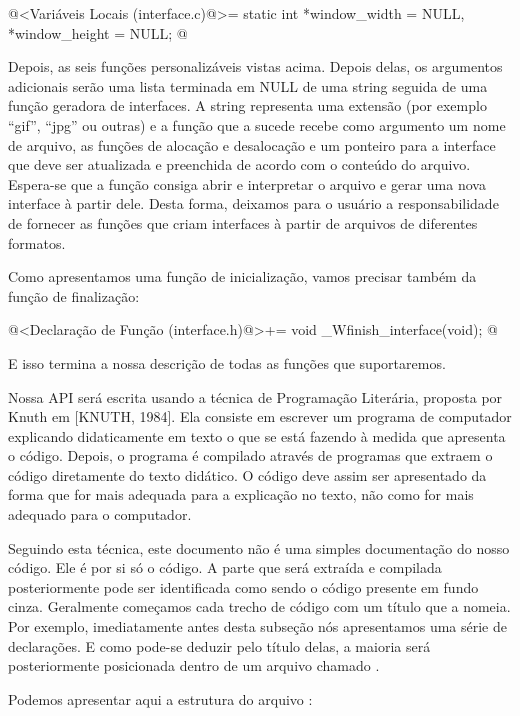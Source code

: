 \iniciocodigo
@<Variáveis Locais (interface.c)@>=
static int *window_width = NULL, *window_height = NULL;
@
\fimcodigo

Depois, as seis funções personalizáveis vistas
acima. Depois delas, os argumentos adicionais serão uma lista
terminada em NULL de uma string seguida de uma função geradora de
interfaces. A string representa uma extensão (por exemplo ``gif'',
``jpg'' ou outras) e a função que a sucede recebe como argumento um
nome de arquivo, as funções de alocação e desalocação e um ponteiro
para a interface que deve ser atualizada e preenchida de acordo com o
conteúdo do arquivo. Espera-se que a função consiga abrir e
interpretar o arquivo e gerar uma nova interface à partir dele.  Desta
forma, deixamos para o usuário a responsabilidade de fornecer as
funções que criam interfaces à partir de arquivos de diferentes
formatos.

Como apresentamos uma função de inicialização, vamos precisar também
da função de finalização:

\iniciocodigo
@<Declaração de Função (interface.h)@>+=
void _Wfinish_interface(void);
@
\fimcodigo

E isso termina a nossa descrição de todas as funções que suportaremos.


Nossa API será escrita usando a técnica de Programação Literária,
proposta por Knuth em [KNUTH, 1984]. Ela consiste em escrever um
programa de computador explicando didaticamente em texto o que se está
fazendo à medida que apresenta o código. Depois, o programa é
compilado através de programas que extraem o código diretamente do
texto didático. O código deve assim ser apresentado da forma que for
mais adequada para a explicação no texto, não como for mais adequado
para o computador.

Seguindo esta técnica, este documento não é uma simples documentação
do nosso código. Ele é por si só o código. A parte que será extraída e
compilada posteriormente pode ser identificada como sendo o código
presente em fundo cinza. Geralmente começamos cada trecho de código
com um título que a nomeia. Por exemplo, imediatamente antes desta
subseção nós apresentamos uma série de declarações. E como pode-se
deduzir pelo título delas, a maioria será posteriormente posicionada
dentro de um arquivo chamado .

Podemos apresentar aqui a estrutura do arquivo
:


